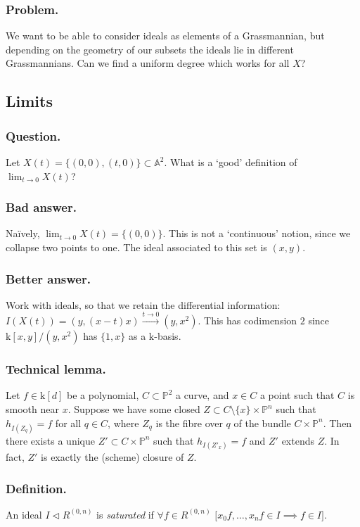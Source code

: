 \documentclass[10pt]{article}
\numberwithin{equation}{subsubsection}
\renewcommand{\P}{\mathbb{P}}
\newcommand{\A}{\mathbb{A}}
\renewcommand{\k}{\mathrm{k}}
\begin{document}
            \subsubsection{Problem.} We want to be able to consider ideals as elements of a Grassmannian, but depending on the geometry of our subsets the ideals lie in different Grassmannians. Can we find a uniform degree which works for all $X$?
        
        \subsection{Limits}
            
            \subsubsection{Question.} Let $X(t)=\{(0,0),(t,0)\}\subset\A^2$. What is a `good' definition of $\lim_{t\to0}X(t)$?
            
            \subsubsection{Bad answer.} Naïvely, $\lim_{t\to0}X(t)=\{(0,0)\}$. This is not a `continuous' notion, since we collapse two points to one. The ideal associated to this set is $(x,y)$.
            
            \subsubsection{Better answer.} Work with ideals, so that we retain the differential information: $I(X(t))=(y,(x-t)x)\xrightarrow{t\to0}(y,x^2)$. This has codimension $2$ since $\k[x,y]/(y,x^2)$ has $\{1,x\}$ as a $\k$-basis.
            
            \subsubsection{Technical lemma.} Let $f\in\k[d]$ be a polynomial, $C\subset\P^2$ a curve, and $x\in C$ a point such that $C$ is smooth near $x$. Suppose we have some closed $Z\subset C\setminus\{x\}\times\P^n$ such that $h_{I(Z_q)}=f$ for all $q\in C$, where $Z_q$ is the fibre over $q$ of the bundle $C\times\P^n$. Then there exists a unique $Z'\subset C\times\P^n$ such that $h_{I(Z'_x)}=f$ and $Z'$ extends $Z$. In fact, $Z'$ is exactly the (scheme) closure of $Z$.
            
            \subsubsection{Definition.} An ideal $I\triangleleft R^{(0,n)}$ is \textit{saturated} if $\forall f\in R^{(0,n)}\,\,\big[x_0f,\ldots,x_nf\in I\implies f\in I\big]$.
            
\end{document}
